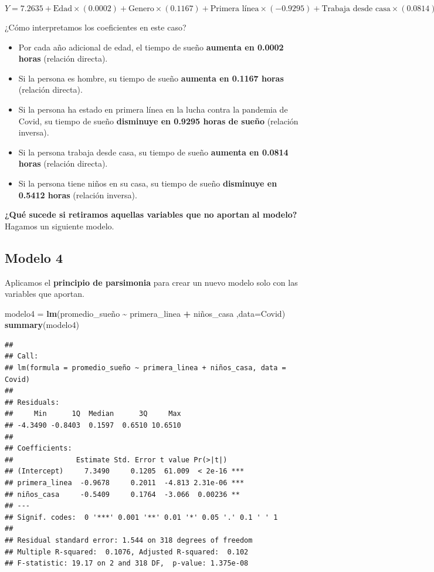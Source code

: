 \documentclass[
]{article}
\newenvironment{Shaded}{\begin{snugshade}}{\end{snugshade}}
\newcommand{\AttributeTok}[1]{\textcolor[rgb]{0.13,0.29,0.53}{#1}}
\newcommand{\FunctionTok}[1]{\textcolor[rgb]{0.13,0.29,0.53}{\textbf{#1}}}
\newcommand{\NormalTok}[1]{#1}
\newcommand{\OtherTok}[1]{\textcolor[rgb]{0.56,0.35,0.01}{#1}}
\newcommand{\SpecialCharTok}[1]{\textcolor[rgb]{0.81,0.36,0.00}{\textbf{#1}}}
\begin{document}
\[
Y = 7.2635 + \text{Edad} \times (0.0002) + \text{Genero} \times (0.1167) + \text{Primera línea} \times (-0.9295) + \text{Trabaja desde casa} \times (0.0814) + \text{Tiene niños en casa} \times (-0.5412)
\]

¿Cómo interpretamos los coeficientes en este caso?

\begin{itemize}
\item
  Por cada año adicional de edad, el tiempo de sueño \textbf{aumenta en
  0.0002 horas} (relación directa).
\item
  Si la persona es hombre, su tiempo de sueño \textbf{aumenta en 0.1167
  horas} (relación directa).
\item
  Si la persona ha estado en primera línea en la lucha contra la
  pandemia de Covid, su tiempo de sueño \textbf{disminuye en 0.9295
  horas de sueño} (relación inversa).
\item
  Si la persona trabaja desde casa, su tiempo de sueño \textbf{aumenta
  en 0.0814 horas} (relación directa).
\item
  Si la persona tiene niños en su casa, su tiempo de sueño
  \textbf{disminuye en 0.5412 horas} (relación inversa).
\end{itemize}

\textbf{¿Qué sucede si retiramos aquellas variables que no aportan al
modelo?} Hagamos un siguiente modelo.

\subsection{\texorpdfstring{\textbf{Modelo
4}}{Modelo 4}}\label{modelo-4}

Aplicamos el \textbf{principio de parsimonia} para crear un nuevo modelo
solo con las variables que aportan.

\begin{Shaded}
\begin{Highlighting}[]
\NormalTok{modelo4 }\OtherTok{=} \FunctionTok{lm}\NormalTok{(promedio\_sueño }\SpecialCharTok{\textasciitilde{}}\NormalTok{ primera\_linea }\SpecialCharTok{+}\NormalTok{ niños\_casa ,}\AttributeTok{data=}\NormalTok{Covid)}
\FunctionTok{summary}\NormalTok{(modelo4)}
\end{Highlighting}
\end{Shaded}

\begin{verbatim}
## 
## Call:
## lm(formula = promedio_sueño ~ primera_linea + niños_casa, data = Covid)
## 
## Residuals:
##     Min      1Q  Median      3Q     Max 
## -4.3490 -0.8403  0.1597  0.6510 10.6510 
## 
## Coefficients:
##               Estimate Std. Error t value Pr(>|t|)    
## (Intercept)     7.3490     0.1205  61.009  < 2e-16 ***
## primera_linea  -0.9678     0.2011  -4.813 2.31e-06 ***
## niños_casa     -0.5409     0.1764  -3.066  0.00236 ** 
## ---
## Signif. codes:  0 '***' 0.001 '**' 0.01 '*' 0.05 '.' 0.1 ' ' 1
## 
## Residual standard error: 1.544 on 318 degrees of freedom
## Multiple R-squared:  0.1076, Adjusted R-squared:  0.102 
## F-statistic: 19.17 on 2 and 318 DF,  p-value: 1.375e-08
\end{verbatim}
\end{document}
